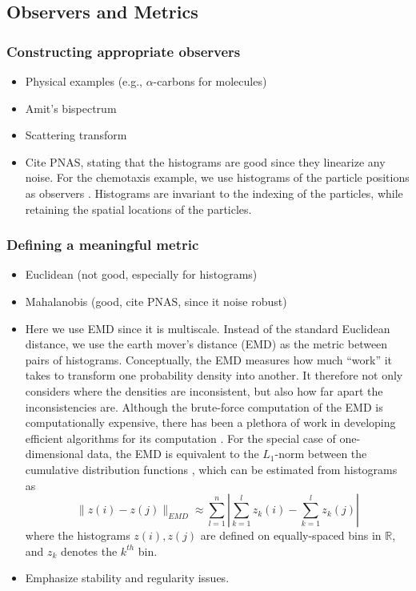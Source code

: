 \documentclass[preprint]{elsarticle}
\begin{document}
\subsection{Observers and Metrics}


\subsubsection{Constructing appropriate observers}


\begin{itemize}
\item Physical examples (e.g., $\alpha$-carbons for molecules)
\item Amit's bispectrum
\item Scattering transform
\item Cite PNAS, stating that the histograms are good since they linearize any noise. 
For the chemotaxis example, we use histograms of the particle positions as observers \cite{talmon2013empirical}. 
%
Histograms are invariant to the indexing of the particles, while retaining the spatial locations of the particles.
\end{itemize}

\subsubsection{Defining a meaningful metric}


\begin{itemize}
\item Euclidean (not good, especially for histograms)
\item Mahalanobis (good, cite PNAS, since it noise robust)
\item Here we use EMD since it is multiscale.
%
Instead of the standard Euclidean distance, we use the earth mover's distance (EMD) \cite{rubner2000earth} as the metric between pairs of histograms. 
%
Conceptually, the EMD measures how much ``work'' it takes to transform one probability density into another.
%
It therefore not only considers where the densities are inconsistent, but also how far apart the inconsistencies are.
%
Although the brute-force computation of the EMD is computationally expensive, there has been a plethora of work in developing efficient algorithms for its computation \cite{Pele-eccv2008, Pele-iccv2009}.
%
For the special case of one-dimensional data, the EMD is equivalent to the $L_1$-norm between the cumulative distribution functions \cite{rubner2000perceptual}, which can be estimated from histograms as
\begin{equation}
\| z(i) - z(j) \|_{EMD} \approx \sum_{l=1}^{n} \left| \sum_{k=1}^l z_k(i) - \sum_{k=1}^l z_k(j) \right|
\end{equation}
where the histograms $z(i), z(j)$ are defined on equally-spaced bins in $\mathbb{R}$, and $z_k$ denotes the $k^{th}$ bin. 
%
\item Emphasize stability and regularity issues.
\end{itemize}
\end{document}
